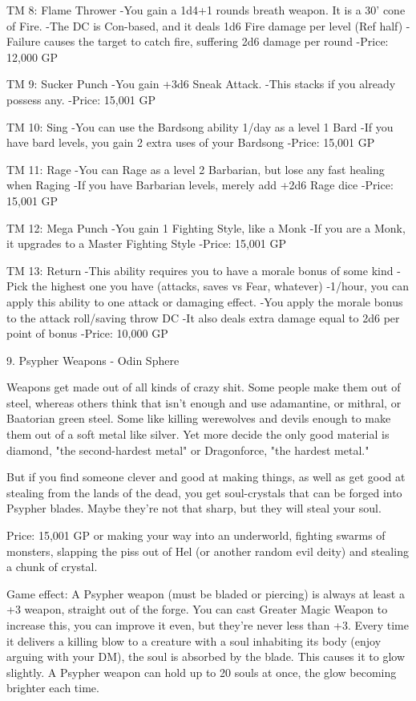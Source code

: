 \begin{multicols}{2}
TM 8: Flame Thrower
-You gain a 1d4+1 rounds breath weapon. It is a 30' cone of Fire.
-The DC is Con-based, and it deals 1d6 Fire damage per level (Ref half)
-Failure causes the target to catch fire, suffering 2d6 damage per round
-Price: 12,000 GP

TM 9: Sucker Punch
-You gain +3d6 Sneak Attack.
-This stacks if you already possess any.
-Price: 15,001 GP

TM 10: Sing
-You can use the Bardsong ability 1/day as a level 1 Bard
-If you have bard levels, you gain 2 extra uses of your Bardsong
-Price: 15,001 GP

TM 11: Rage
-You can Rage as a level 2 Barbarian, but lose any fast healing when Raging
-If you have Barbarian levels, merely add +2d6 Rage dice
-Price: 15,001 GP

TM 12: Mega Punch
-You gain 1 Fighting Style, like a Monk
-If you are a Monk, it upgrades to a Master Fighting Style
-Price: 15,001 GP

TM 13: Return
-This ability requires you to have a morale bonus of some kind
-Pick the highest one you have (attacks, saves vs Fear, whatever)
-1/hour, you can apply this ability to one attack or damaging effect.
-You apply the morale bonus to the attack roll/saving throw DC
-It also deals extra damage equal to 2d6 per point of bonus
-Price: 10,000 GP



9. Psypher Weapons - Odin Sphere

Weapons get made out of all kinds of crazy shit. Some people make them out of steel, whereas others think that isn't enough and use adamantine, or mithral, or Baatorian green steel. Some like killing werewolves and devils enough to make them out of a soft metal like silver. Yet more decide the only good material is diamond, "the second-hardest metal" or Dragonforce, "the hardest metal."

But if you find someone clever and good at making things, as well as get good at stealing from the lands of the dead, you get soul-crystals that can be forged into Psypher blades. Maybe they're not that sharp, but they will steal your soul.

Price: 15,001 GP or making your way into an underworld, fighting swarms of monsters, slapping the piss out of Hel (or another random evil deity) and stealing a chunk of crystal.

Game effect:
A Psypher weapon (must be bladed or piercing) is always at least a +3 weapon, straight out of the forge. You can cast Greater Magic Weapon to increase this, you can improve it even, but they're never less than +3. Every time it delivers a killing blow to a creature with a soul inhabiting its body (enjoy arguing with your DM), the soul is absorbed by the blade. This causes it to glow slightly. A Psypher weapon can hold up to 20 souls at once, the glow becoming brighter each time.


\end{multicols}
